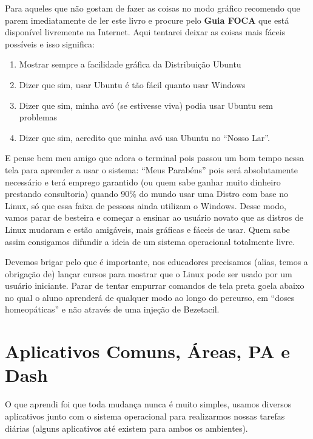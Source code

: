 Para aqueles que não gostam de fazer as coisas no modo gráfico recomendo que parem imediatamente de ler este livro e procure pelo \textbf{Guia FOCA} que está disponível livremente na Internet. Aqui tentarei deixar as coisas mais fáceis possíveis e isso significa: \vspace{-1em}
\begin{enumerate}[noitemsep]
 \item Mostrar sempre a facilidade gráfica da Distribuição Ubuntu
 \item Dizer que sim, usar Ubuntu é tão fácil quanto usar Windows
 \item Dizer que sim, minha avó (se estivesse viva) podia usar Ubuntu sem problemas
 \item Dizer que sim, acredito que minha avó usa Ubuntu no ``Nosso Lar''.
\end{enumerate}
E pense bem meu amigo que adora o terminal pois passou um bom tempo nessa tela para aprender a usar o sistema: ``Meus Parabéns'' pois será absolutamente necessário e terá emprego garantido (ou quem sabe ganhar muito dinheiro prestando consultoria) quando 90\% do mundo usar uma Distro com base no Linux, só que essa faixa de pessoas ainda utilizam o Windows. Desse modo, vamos parar de besteira e começar a ensinar ao usuário novato que as distros de Linux mudaram e estão amigáveis, mais gráficas e fáceis de usar. Quem sabe assim consigamos difundir a ideia de um sistema operacional totalmente livre.

Devemos brigar pelo que é importante, nos educadores precisamos (alias, temos a obrigação de) lançar cursos para mostrar que o Linux pode ser usado por um usuário iniciante. Parar de tentar empurrar comandos de tela preta goela abaixo no qual o aluno aprenderá de qualquer modo ao longo do percurso, em ``doses homeopáticas'' e não através de uma injeção de Bezetacil.

\section{Aplicativos Comuns, Áreas, PA e Dash}
O que aprendi foi que toda mudança nunca é muito simples, usamos diversos aplicativos junto com o sistema operacional para realizarmos nossas tarefas diárias (alguns aplicativos até existem para ambos os ambientes).

